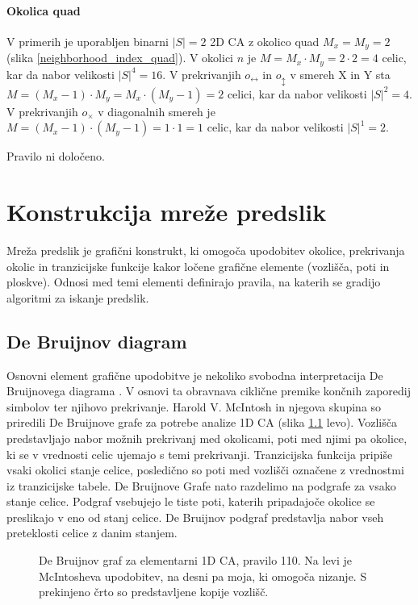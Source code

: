 \documentclass[12pt,a4paper,openany,twoside]{book}
\begin{document}
\subsubsection{Okolica quad}

V primerih je uporabljen binarni \(|S|=2\) 2D CA z okolico quad \(M_x=M_y=2\) (slika \ref{neighborhood_index_quad}).
V okolici \(n\) je \(M=M_x \cdot M_y=2 \cdot 2=4\) celic, kar da nabor velikosti \(|S|^4=16\).
V prekrivanjih \(o_{\leftrightarrow}\) in \(o_{\updownarrow}\) v smereh X in Y
sta \(M=(M_x-1) \cdot M_y=M_x \cdot (M_y-1)=2\) celici, kar da nabor velikosti \(|S|^2=4\).
V prekrivanjih \(o_{\times}\) v diagonalnih smereh
je \(M=(M_x-1) \cdot (M_y-1)=1 \cdot 1=1\) celic, kar da nabor velikosti \(|S|^1=2\).

Pravilo ni določeno.

\chapter{Konstrukcija mreže predslik}

Mreža predslik je grafični konstrukt, ki omogoča upodobitev
okolice, prekrivanja okolic in tranzicijske funkcije
kakor ločene grafične elemente (vozlišča, poti in ploskve).
Odnosi med temi elementi definirajo pravila,
na katerih se gradijo algoritmi za iskanje predslik.

\section{De Bruijnov diagram}

Osnovni element grafične upodobitve je nekoliko svobodna interpretacija De Bruijnovega diagrama \cite{WikiDeBruijn}.
V osnovi ta obravnava ciklične premike končnih zaporedij simbolov ter njihovo prekrivanje.
Harold V. McIntosh \cite{McIntosh1991} in njegova skupina \cite{Soto2008}
so priredili De Bruijnove grafe za potrebe analize 1D CA (slika \ref{de_bruijn_diagram} levo).
Vozlišča predstavljajo nabor možnih prekrivanj med okolicami,
poti med njimi pa okolice, ki se v vrednosti celic ujemajo s temi prekrivanji.
Tranzicijska funkcija pripiše vsaki okolici stanje celice,
posledično so poti med vozlišči označene z vrednostmi iz tranzicijske tabele.
De Bruijnove Grafe nato razdelimo na podgrafe za vsako stanje celice.
Podgraf vsebujejo le tiste poti, katerih pripadajoče okolice se preslikajo v eno od stanj celice.
De Bruijnov podgraf predstavlja nabor vseh preteklosti celice z danim stanjem.

\begin{figure}[htb]
\centerline{}
\caption[De Bruijnov graf, pravilo 110.]
{De Bruijnov graf za elementarni 1D CA, pravilo 110.
Na levi je McIntosheva upodobitev, na desni pa moja, ki omogoča nizanje.
S prekinjeno črto so predstavljene kopije vozlišč.}
\label{de_bruijn_diagram}
\end{figure}
\end{document}
